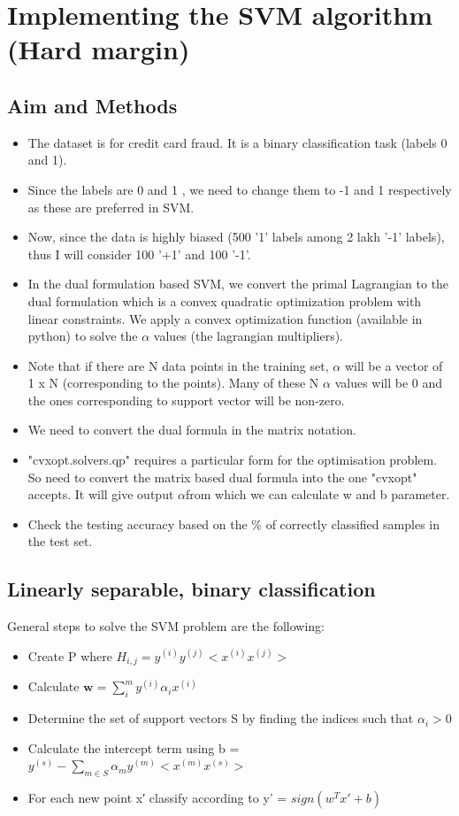 \documentclass[12pt]{article}
\begin{document}
\section{Implementing the SVM algorithm (Hard margin)}
\subsection{Aim and Methods}
\begin{itemize}
    \item The dataset is for credit card fraud. It is a binary classification task (labels 0 and 1).
    \item Since the labels are 0 and 1 , we need to change them to -1 and 1 respectively as these are preferred in SVM.
    \item Now, since the data is highly biased (500 '1' labels among 2 lakh '-1' labels), thus I will consider 100 '+1' and 100 '-1'.
    \item In the dual formulation based SVM, we convert the primal Lagrangian to the dual formulation which is a convex quadratic optimization problem with linear constraints. We apply a convex optimization function  (available in python) to solve the $\alpha$ values (the lagrangian multipliers).
    \item Note that if there are N data points in the training set, $\alpha$ will be a vector of 1 x N (corresponding to the points). Many of these N $\alpha$ values will be 0 and the ones corresponding to support vector will be non-zero.
    \item We need to convert the dual formula in the matrix notation.
    \item "cvxopt.solvers.qp" requires a particular form for the optimisation problem. So need to convert the matrix based dual formula into the one "cvxopt" accepts. It will give output $\alpha$from which we can calculate w and b parameter.
    \item  Check the testing accuracy based on the \% of correctly classified samples in the test set. 
    
\end{itemize}
\subsection{Linearly separable, binary classification}
General steps to solve the SVM problem are the following:

\begin{itemize}
\item Create P where $H_{i,j} = y^{(i)}y^{(j)} <x^{(i)} x^{(j)}>$
\item Calculate $\mathbf{w} = \sum_i^m y^{(i)} \alpha_i x^{(i)}$
\item Determine the set of support vectors S by finding the indices such that $\alpha_i > 0$
\item Calculate the intercept term using b = $y^{(s)} - \sum_{m \in S} \alpha_m  y^{(m)}  <x^{(m)}  x^{(s)} >$
\item For each new point x′ classify according to y' = $ sign(w^T x' + b)$
\end{itemize}
\end{document}

